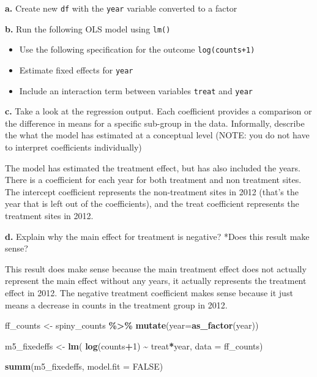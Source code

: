 \documentclass[
]{article}
\newenvironment{Shaded}{\begin{snugshade}}{\end{snugshade}}
\newcommand{\AttributeTok}[1]{\textcolor[rgb]{0.13,0.29,0.53}{#1}}
\newcommand{\ConstantTok}[1]{\textcolor[rgb]{0.56,0.35,0.01}{#1}}
\newcommand{\DecValTok}[1]{\textcolor[rgb]{0.00,0.00,0.81}{#1}}
\newcommand{\FunctionTok}[1]{\textcolor[rgb]{0.13,0.29,0.53}{\textbf{#1}}}
\newcommand{\NormalTok}[1]{#1}
\newcommand{\OtherTok}[1]{\textcolor[rgb]{0.56,0.35,0.01}{#1}}
\newcommand{\SpecialCharTok}[1]{\textcolor[rgb]{0.81,0.36,0.00}{\textbf{#1}}}
\providecommand{\tightlist}{%
  \setlength{\itemsep}{0pt}\setlength{\parskip}{0pt}}
\begin{document}
\textbf{a.} Create new \texttt{df} with the \texttt{year} variable
converted to a factor

\textbf{b.} Run the following OLS model using \texttt{lm()}

\begin{itemize}
\tightlist
\item
  Use the following specification for the outcome \texttt{log(counts+1)}
\item
  Estimate fixed effects for \texttt{year}
\item
  Include an interaction term between variables \texttt{treat} and
  \texttt{year}
\end{itemize}

\textbf{c.} Take a look at the regression output. Each coefficient
provides a comparison or the difference in means for a specific
sub-group in the data. Informally, describe the what the model has
estimated at a conceptual level (NOTE: you do not have to interpret
coefficients individually)

The model has estimated the treatment effect, but has also included the
years. There is a coefficient for each year for both treatment and non
treatment sites. The intercept coefficient represents the non-treatment
sites in 2012 (that's the year that is left out of the coefficients),
and the treat coefficient represents the treatment sites in 2012.

\textbf{d.} Explain why the main effect for treatment is negative? *Does
this result make sense?

This result does make sense because the main treatment effect does not
actually represent the main effect without any years, it actually
represents the treatment effect in 2012. The negative treatment
coefficient makes sense because it just means a decrease in counts in
the treatment group in 2012.

\begin{Shaded}
\begin{Highlighting}[]
\NormalTok{ff\_counts }\OtherTok{\textless{}{-}}\NormalTok{ spiny\_counts }\SpecialCharTok{\%\textgreater{}\%} 
    \FunctionTok{mutate}\NormalTok{(}\AttributeTok{year=}\FunctionTok{as\_factor}\NormalTok{(year))}
    
\NormalTok{m5\_fixedeffs }\OtherTok{\textless{}{-}} \FunctionTok{lm}\NormalTok{(}
    \FunctionTok{log}\NormalTok{(counts}\SpecialCharTok{+}\DecValTok{1}\NormalTok{) }\SpecialCharTok{\textasciitilde{}}\NormalTok{ treat}\SpecialCharTok{*}\NormalTok{year,}
    \AttributeTok{data =}\NormalTok{ ff\_counts)}

\FunctionTok{summ}\NormalTok{(m5\_fixedeffs, }\AttributeTok{model.fit =} \ConstantTok{FALSE}\NormalTok{)}
\end{Highlighting}
\end{Shaded}
\end{document}
